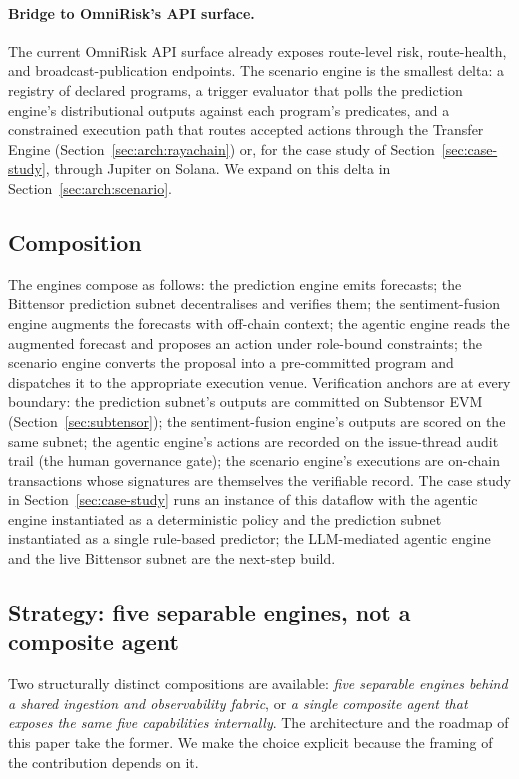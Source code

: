 \documentclass[11pt,a4paper]{article}
\begin{document}
\paragraph{Bridge to OmniRisk's API surface.} The current OmniRisk API surface
already exposes route-level risk, route-health, and broadcast-publication
endpoints. The scenario engine is the smallest delta: a registry of declared
programs, a trigger evaluator that polls the prediction engine's distributional
outputs against each program's predicates, and a constrained execution path that
routes accepted actions through the Transfer Engine (Section~\ref{sec:arch:rayachain})
or, for the case study of Section~\ref{sec:case-study}, through Jupiter on
Solana. We expand on this delta in Section~\ref{sec:arch:scenario}.

\subsection{Composition}\label{sec:engine:composition}

The engines compose as follows: the prediction engine emits forecasts; the Bittensor
prediction subnet decentralises and verifies them; the sentiment-fusion engine
augments the forecasts with off-chain context; the agentic engine reads the
augmented forecast and proposes an action under role-bound constraints; the
scenario engine converts the proposal into a pre-committed program and dispatches
it to the appropriate execution venue. Verification anchors are at every boundary:
the prediction subnet's outputs are committed on Subtensor EVM
(Section~\ref{sec:subtensor}); the sentiment-fusion engine's outputs are scored on
the same subnet; the agentic engine's actions are recorded on the issue-thread
audit trail (the human governance gate); the scenario engine's executions are
on-chain transactions whose signatures are themselves the verifiable record. The
case study in Section~\ref{sec:case-study} runs an instance of this dataflow with
the agentic engine instantiated as a deterministic policy and the prediction
subnet instantiated as a single rule-based predictor; the LLM-mediated agentic
engine and the live Bittensor subnet are the next-step build.

\subsection{Strategy: five separable engines, not a composite agent}\label{sec:engine:strategy}

Two structurally distinct compositions are available: \emph{five separable engines
behind a shared ingestion and observability fabric}, or \emph{a single composite
agent that exposes the same five capabilities internally}. The architecture and the
roadmap of this paper take the former. We make the choice explicit because the
framing of the contribution depends on it.
\end{document}
